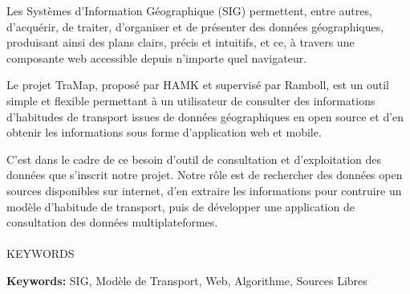 

Les Systèmes d'Information Géographique (SIG) permettent, entre autres, d'acquérir, de traiter, d'organiser et de présenter des données géographiques, produisant ainsi des plans clairs, précis et intuitifs, et ce, à travers une composante web accessible depuis n'importe quel navigateur.

Le projet TraMap, proposé par HAMK et supervisé par Ramboll, est un outil simple et flexible permettant à un utilisateur de consulter des informations d'habitudes de transport issues de données géographiques en open source et d'en obtenir les informations sous forme d'application web et mobile.

C'est dans le cadre de ce besoin d'outil de consultation et d'exploitation des données que s'inscrit notre projet. Notre rôle est de rechercher des données open sources disponibles sur internet, d'en extraire les informations pour contruire un modèle d'habitude de transport, puis de développer une application de consultation des données multiplateformes. \\ \\

KEYWORDS
\par
\smallskip
\noindent \textbf{Keywords:} SIG, Modèle de Transport, Web, Algorithme, Sources Libres
